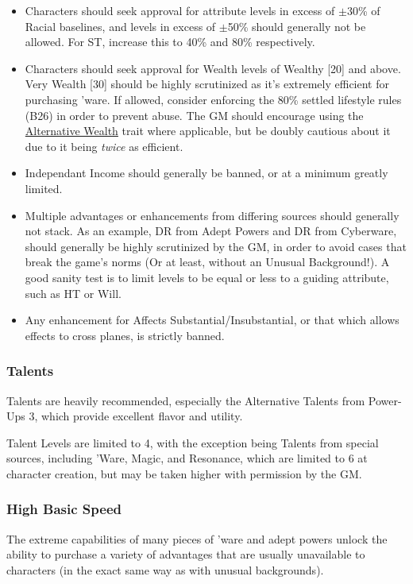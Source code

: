 \begin{multicols*}{3}
	\begin{itemize}
		\itemsep 0pt
		\item Characters should seek approval for attribute levels in excess of \(\pm\)30\% of Racial baselines, and levels in excess of \(\pm\)50\% should generally not be allowed. For ST, increase this to 40\% and 80\% respectively.
		\item Characters should seek approval for Wealth levels of Wealthy [20] and above. Very Wealth [30] should be highly scrutinized as it's extremely efficient for purchasing 'ware. If allowed, consider enforcing the 80\% settled lifestyle rules (B26) in order to prevent abuse. The GM should encourage using the \hyperref[wealth]{Alternative Wealth} trait where applicable, but be doubly cautious about it due to it being \textit{twice} as efficient.
		\item Independant Income should generally be banned, or at a minimum greatly limited.
		\item Multiple advantages or enhancements from differing sources should generally not stack. As an example, DR from Adept Powers and DR from Cyberware, should generally be highly scrutinized by the GM, in order to avoid cases that break the game's norms (Or at least, without an Unusual Background!). A good sanity test is to limit levels to be equal or less to a guiding attribute, such as HT or Will.
		\item Any enhancement for Affects Substantial/Insubstantial, or that which allows effects to cross planes, is strictly banned.
	\end{itemize}
	
	\subsubsection{Talents}
	
	Talents are heavily recommended, especially the Alternative Talents from Power-Ups 3, which provide excellent flavor and utility. 
	
	Talent Levels are limited to 4, with the exception being Talents from special sources, including 'Ware, Magic, and Resonance, which are limited to 6 at character creation, but may be taken higher with permission by the GM.
	
	\subsubsection{High Basic Speed}\label{high_basic_speed}
	
	The extreme capabilities of many pieces of 'ware and adept powers unlock the ability to purchase a variety of advantages that are usually unavailable to characters (in the exact same way as with unusual backgrounds).
	

\end{multicols*}
